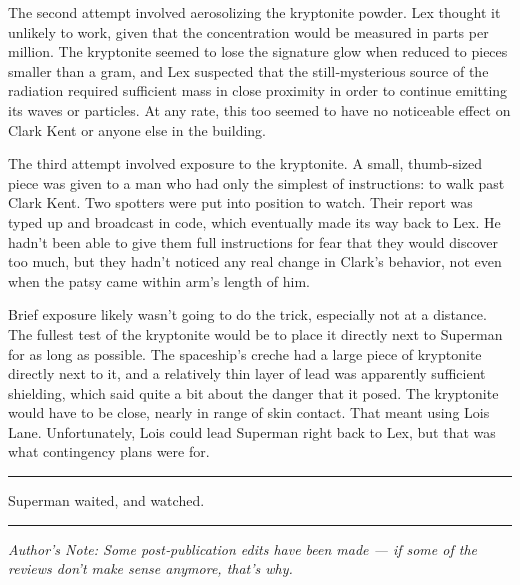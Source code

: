 The second attempt involved aerosolizing the kryptonite powder. Lex
thought it unlikely to work, given that the concentration would be
measured in parts per million. The kryptonite seemed to lose the
signature glow when reduced to pieces smaller than a gram, and Lex
suspected that the still‐mysterious source of the radiation required
sufficient mass in close proximity in order to continue emitting its
waves or particles. At any rate, this too seemed to have no noticeable
effect on Clark Kent or anyone else in the building.

The third attempt involved exposure to the kryptonite. A small,
thumb‐sized piece was given to a man who had only the simplest of
instructions: to walk past Clark Kent. Two spotters were put into
position to watch. Their report was typed up and broadcast in code,
which eventually made its way back to Lex. He hadn't been able to give
them full instructions for fear that they would discover too much, but
they hadn't noticed any real change in Clark's behavior, not even when
the patsy came within arm's length of him.

Brief exposure likely wasn't going to do the trick, especially not at a
distance. The fullest test of the kryptonite would be to place it
directly next to Superman for as long as possible. The spaceship's
creche had a large piece of kryptonite directly next to it, and a
relatively thin layer of lead was apparently sufficient shielding, which
said quite a bit about the danger that it posed. The kryptonite would
have to be close, nearly in range of skin contact. That meant using Lois
Lane. Unfortunately, Lois could lead Superman right back to Lex, but
that was what contingency plans were for.

\begin{center}\rule{0.5\linewidth}{\linethickness}\end{center}

Superman waited, and watched.

\begin{center}\rule{0.5\linewidth}{\linethickness}\end{center}

\emph{Author's Note: Some post‐publication edits have been made --- if
some of the reviews don't make sense anymore, that's why.}
